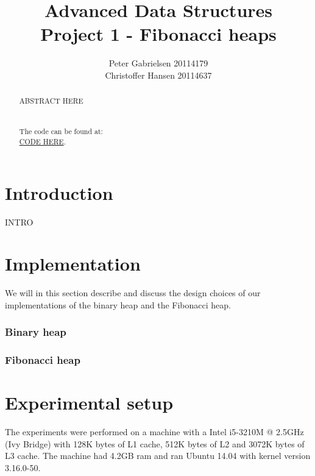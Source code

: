 \documentclass[a4paper,oneside,article,11pt]{memoir}
\title{Advanced Data Structures \\ Project 1 - Fibonacci heaps}
\author{Peter Gabrielsen 20114179 \\
Christoffer Hansen 20114637}
\begin{document}
\begin{titlingpage}
\clearpage

\maketitle
\thispagestyle{empty}

\begin{abstract}
ABSTRACT HERE
\\
\\
\\
The code can be found at: \\\url{CODE HERE}.
\end{abstract}
\end{titlingpage}

\pagebreak

\tableofcontents

\pagebreak

\chapter{Introduction}
INTRO

\chapter{Implementation}
We will in this section describe and discuss the design choices of our implementations of the binary heap and the Fibonacci heap.
\subsection{Binary heap}

\subsection{Fibonacci heap}

\chapter{Experimental setup}

The experiments were performed on a machine with a Intel i5-3210M @ 2.5GHz (Ivy Bridge) with 128K bytes of L1 cache, 512K bytes of L2 and 3072K bytes of L3 cache. The machine had 4.2GB ram and ran Ubuntu 14.04 with kernel version 3.16.0-50.
\end{document}

